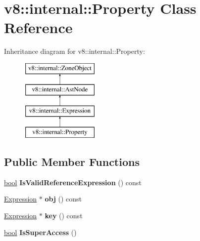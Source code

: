 \hypertarget{classv8_1_1internal_1_1Property}{}\section{v8\+:\+:internal\+:\+:Property Class Reference}
\label{classv8_1_1internal_1_1Property}
Inheritance diagram for v8\+:\+:internal\+:\+:Property\+:\begin{figure}[H]
\begin{center}
\leavevmode
\includegraphics[height=4.000000cm]{classv8_1_1internal_1_1Property}
\end{center}
\end{figure}
\subsection*{Public Member Functions}
\begin{DoxyCompactItemize}
\item 
\mbox{\label{classv8_1_1internal_1_1Property_afb3719b8d62c05c33ad87b969752ed01}} 
\mbox{\hyperlink{classbool}{bool}} {\bfseries Is\+Valid\+Reference\+Expression} () const
\item 
\mbox{\label{classv8_1_1internal_1_1Property_a048c70a0f9677e44e0cf494465bc3464}} 
\mbox{\hyperlink{classv8_1_1internal_1_1Expression}{Expression}} $\ast$ {\bfseries obj} () const
\item 
\mbox{\label{classv8_1_1internal_1_1Property_a1d1141ba5e1825aa137df8a6a668fae6}} 
\mbox{\hyperlink{classv8_1_1internal_1_1Expression}{Expression}} $\ast$ {\bfseries key} () const
\item 
\mbox{\label{classv8_1_1internal_1_1Property_a6843df847d166de1422424b8a38fb3cf}} 
\mbox{\hyperlink{classbool}{bool}} {\bfseries Is\+Super\+Access} ()
\end{DoxyCompactItemize}
